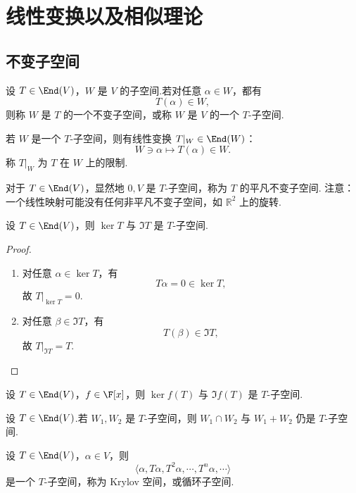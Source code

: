 \setchapterintro{}
\chapter{线性变换以及相似理论}

\section{不变子空间}

\begin{definition}\label{p1:concept:c5-l8}
	设 $T\in\End(V)$，$W$ 是 $V$ 的子空间.若对任意 $\alpha\in W$，都有
	\[
	T(\alpha)\in W,
	\]
	则称 $W$ 是 $T$ 的一个不变子空间，或称 $W$ 是 $V$ 的一个 $T$-子空间.
	
	若 $W$ 是一个 $T$-子空间，则有线性变换 $T|_W\in\End(W)$：
	\[
	W\ni\alpha\longmapsto T(\alpha)\in W.
	\]
	称 $T|_W$ 为 $T$ 在 $W$ 上的限制.
\end{definition}

\label{p1:concept:c5-l22}对于 $T\in\End(V)$，显然地 $0,V$ 是 $T$-子空间，称为 $T$ 的平凡不变子空间.
注意：一个线性映射可能没有任何非平凡不变子空间，如 $\mathbb{R}^2$ 上的旋转.

\begin{proposition}
	设 $T\in\End(V)$，则 $\ker T$ 与 $\Im T$ 是 $T$-子空间.
\end{proposition}

\begin{proof}
	\begin{enumerate}
	\item 对任意 $\alpha\in\ker T$，有
	\[
	T\alpha=0\in\ker T,
	\]
	故 $T|_{\ker T}=0$.
	
	\item 对任意 $\beta\in\Im T$，有
	\[
	T(\beta)\in\Im T,
	\]
	故 $T|_{\Im T}=T$.
\end{enumerate}
\end{proof}


\begin{corollary}
设 $T\in\End(V)$，$f\in\F[x]$，则 $\ker f(T)$ 与 $\Im f(T)$ 是 $T$-子空间.
\end{corollary}

\begin{example}
设 $T\in\End(V)$.若 $W_1,W_2$ 是 $T$-子空间，则 $W_1\cap W_2$ 与 $W_1+W_2$ 仍是 $T$-子空间.
\end{example}

\begin{example}
设 $T\in\End(V)$，$\alpha\in V$，则
\[
\langle \alpha,T\alpha,T^2\alpha,\cdots,T^n\alpha,\cdots\rangle
\]
\label{p1:concept:c5-l59}是一个 $T$-子空间，称为 Krylov 空间，或循环子空间.
\end{example}

